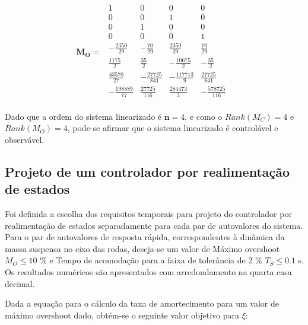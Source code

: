     \begin{equation} \label{eq:MO}
        \begin{split}
             \mathbf{M_O}=
        \end{split}
        \begin{smallmatrix}
           1&              0&              0&              0&\\
           0&              0&              1&              0&\\       
           0&              1&              0&              0&\\       
           0&              0&              0&              1&\\    
       -\frac{2350}{29}&   -\frac{70}{29}&      \frac{2350}{29}&   \frac{ 70}{29}&\\    
        \frac{1175}{2}&     \frac{35}{2}&      -\frac{10675}{2}&  -\frac{35}{2}&\\    
        \frac{43570}{27}&  -\frac{27725}{841}& -\frac{117713}{9}&  \frac{27725}{841}&\\
       -\frac{198889}{17}&  \frac{27725}{116}&  \frac{284473}{3}& -\frac{578725}{116}&\\
        \end{smallmatrix}
    \end{equation}

Dado que a ordem do sistema linearizado é $\mathbf{n}=4$, e como o $Rank(M_C)=4$ e $Rank(M_O)=4$, pode-se afirmar que o sistema linearizado é controlável e observável.

    
        \subsection{Projeto de um controlador por realimentação de estados} \label{sc:projeto_controlador_full}

Foi definida a escolha dos requisitos temporais para projeto do controlador por realimentação de estados separadamente para cada par de autovalores do sistema. Para o par de autovalores de resposta rápida, correspondentes à dinâmica da massa suspensa no eixo das rodas, deseja-se um valor de Máximo overshoot $M_O \leq 10$ \% e Tempo de acomodação para a faixa de tolerância de 2 \% $T_S \leq 0.1$ s. Os resultados numéricos são apresentados com arredondamento na quarta casa decimal.

Dada a equação   para o cálculo da taxa de amortecimento para um valor de máximo overshoot dado, obtém-se o seguinte valor objetivo para $\xi$:


